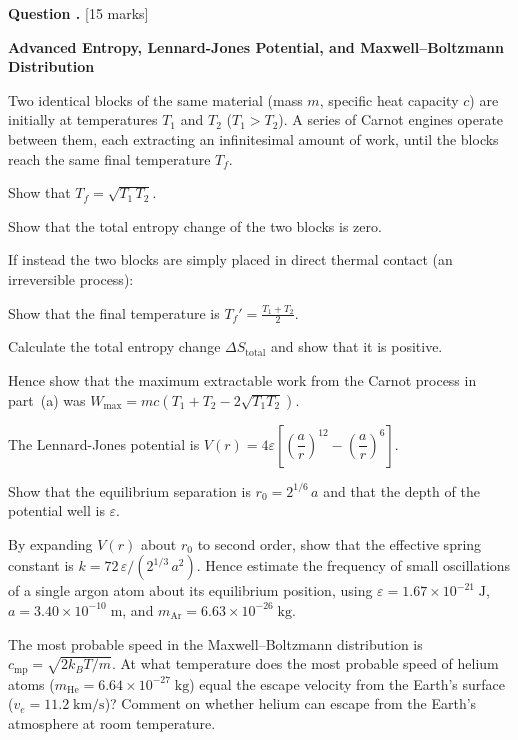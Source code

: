 \documentclass[12pt,a4paper]{article}
\newcounter{questioncounter}
\newcommand{\question}[1]{%
  \stepcounter{questioncounter}%
  \vspace{0.5cm}%
  \noindent\textbf{Question \thequestioncounter.} \hfill [#1 marks]%
  \vspace{0.2cm}%
  \par%
}
\begin{document}
\newpage

\question{15}

\noindent\textbf{Advanced Entropy, Lennard-Jones Potential, and Maxwell--Boltzmann Distribution}

\begin{parts}
\item Two identical blocks of the same material (mass $m$, specific heat capacity $c$) are initially at temperatures $T_1$ and $T_2$ ($T_1 > T_2$). A series of Carnot engines operate between them, each extracting an infinitesimal amount of work, until the blocks reach the same final temperature $T_f$.
\begin{parts}
\item Show that $T_f = \sqrt{T_1\,T_2}$. 
\item Show that the total entropy change of the two blocks is zero. 
\end{parts}

\item If instead the two blocks are simply placed in direct thermal contact (an irreversible process):
\begin{parts}
\item Show that the final temperature is $T_f' = \frac{T_1 + T_2}{2}$. 
\item Calculate the total entropy change $\Delta S_\text{total}$ and show that it is positive. 
\item Hence show that the maximum extractable work from the Carnot process in part~(a) was $W_\text{max} = mc\!\left(T_1 + T_2 - 2\sqrt{T_1 T_2}\right)$. 
\end{parts}

\item The Lennard-Jones potential is $V(r) = 4\varepsilon\!\left[\left(\dfrac{a}{r}\right)^{12} - \left(\dfrac{a}{r}\right)^{6}\right]$.
\begin{parts}
\item Show that the equilibrium separation is $r_0 = 2^{1/6}\,a$ and that the depth of the potential well is $\varepsilon$. 
\item By expanding $V(r)$ about $r_0$ to second order, show that the effective spring constant is $k = 72\,\varepsilon / (2^{1/3}\,a^2)$. Hence estimate the frequency of small oscillations of a single argon atom about its equilibrium position, using $\varepsilon = 1.67\times 10^{-21}\;\text{J}$, $a = 3.40\times 10^{-10}\;\text{m}$, and $m_\text{Ar} = 6.63\times 10^{-26}\;\text{kg}$. 
\end{parts}

\item The most probable speed in the Maxwell--Boltzmann distribution is $c_\text{mp} = \sqrt{2k_BT/m}$. At what temperature does the most probable speed of helium atoms ($m_\text{He} = 6.64\times 10^{-27}\;\text{kg}$) equal the escape velocity from the Earth's surface ($v_e = 11.2\;\text{km/s}$)? Comment on whether helium can escape from the Earth's atmosphere at room temperature. 
\end{parts}
\end{document}
